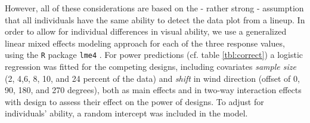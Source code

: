 

However, all of these considerations are based on the - rather strong - assumption that all individuals have the same ability to detect the data plot from a lineup. In order to allow for individual differences in visual ability, 
 we use a generalized linear mixed effects modeling  approach \cite{pinheiro:2000} for each of the three response values, using the {\tt R} package {\tt lme4} \cite{bates:2011}. 
For power predictions (cf. table \ref{tbl:correct}) a logistic regression was fitted for the competing designs, including covariates {\it sample size} (2, 4,6, 8, 10, and 24 percent of the data) and {\it shift} in wind direction (offset of 0, 90, 180, and 270 degrees), both as main effects and in two-way interaction effects with design to assess their effect on the power of designs. To adjust for individuals' ability, a random intercept was included in the model.

